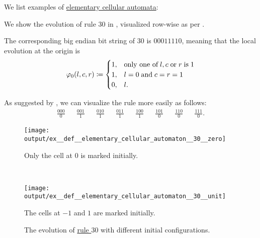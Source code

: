 \begin{example}\label{ex:def:elementary_cellular_automaton}
  We list examples of \hyperref[def:elementary_cellular_automaton]{elementary cellular automata}:
  \begin{thmenum}
     We show the evolution of rule \( 30 \) in , visualized row-wise as per .

    The corresponding big endian bit string of \( 30 \) is \( 00011110 \), meaning that the local evolution at the origin is
    \begin{equation*}
      \varphi_0(l, c, r) \coloneqq \begin{cases}
        1, &\T{only one of} l, c \T{or} r \T{is} 1 \\
        1, &l = 0 \T{and} c = r = 1 \\
        0, &l.
      \end{cases}
    \end{equation*}

    As suggested by , we can visualize the rule more easily as follows:
    \begin{align*}
      \frac {000} 0
      &&
      \frac {001} 1
      &&
      \frac {010} 1
      &&
      \frac {011} 1
      &&
      \frac {100} 1
      &&
      \frac {101} 0
      &&
      \frac {110} 0
      &&
      \frac {111} 0.
    \end{align*}

    \begin{figure}[!ht]
      \begin{subcaptionblock}{\textwidth}
        \centering
        \texttt{[image: output/ex\_\_def\_\_elementary\_cellular\_automaton\_\_30\_\_zero]}
        \caption{Only the cell at \( 0 \) is marked initially.}\label{fig:ex:def:elementary_cellular_automaton/30/zero}
      \end{subcaptionblock}
      \\[\baselineskip]
      \begin{subcaptionblock}{\textwidth}
        \centering
        \texttt{[image: output/ex\_\_def\_\_elementary\_cellular\_automaton\_\_30\_\_unit]}
        \caption{The cells at \( -1 \) and \( 1 \) are marked initially.}\label{fig:ex:def:elementary_cellular_automaton/30/unit}
      \end{subcaptionblock}
      \caption{The evolution of \hyperref[ex:def:elementary_cellular_automaton/30]{rule \( 30 \)} with different initial configurations.}\label{fig:ex:def:elementary_cellular_automaton/30}
    \end{figure}


\end{thmenum}
\end{example}
